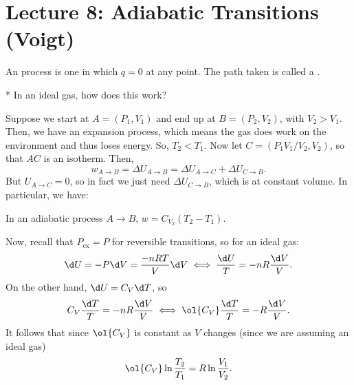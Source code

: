\section*{Lecture 8: Adiabatic Transitions (Voigt)}
\setcounter{section}{8}
\setcounter{subsection}{0}
\setcounter{defn}{0}
\setcounter{defncontainer}{0}

\begin{defn}
	An  process is one in which $q = 0$ at any point.
	The path taken is called a .
\end{defn}

\begin{que}*
	In an ideal gas, how does this work? 
\end{que}
	
Suppose we start at $A = (P_1,V_1)$ and end up at $B = (P_2, V_2)$, with $V_2 > V_1$. 
Then, we have an expansion process, which means the gas does work on the environment and thus loses energy.
So, $T_2 < T_1$.
Now let $C = (P_1V_1/V_2, V_2)$, so that $AC$ is an isotherm. Then, \[
	w_{A\to B} = \Delta U_{A\to B} = \Delta U_{A\to C} + \Delta U_{C\to B}. 
\]	
But $U_{A\to C} = 0$, so in fact we just need $\Delta U_{C\to B}$, which is at constant volume. In particular, we have:

\begin{fact}
	In an adiabatic process $A\to B$, $w = C_{V_2} (T_2 - T_1)$.
\end{fact}

Now, recall that $P_{\text{ex}} = P$ for reversible transitions, so for an ideal gas: \[
	\d U = - P \d V = \frac{- nRT}{V} \d V \iff \frac{\d U}{T} = -nR \frac{\d V}{V}.
\]
On the other hand, $\d U = C_V \d T$, so \[
	C_V\frac{\d T}{T} = -nR \frac{\d V}{V} \iff \ol{C_V}\frac{\d T}{T} = -R \frac{\d V}{V}.
\]It follows that since $\ol{C_V}$ is constant as $V$ changes (since we are assuming an ideal gas) \[
	\ol{C_V} \ln \frac{T_2}{T_1} = R \ln \frac{V_1}{V_2}.
\]


